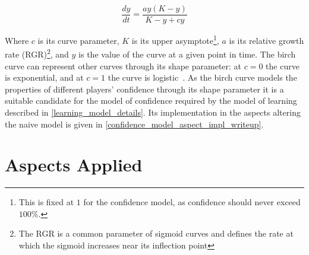\[\frac{dy}{dt} = \frac{ay(K-y)}{K-y+cy}\]

Where $c$ is its curve parameter, $K$ is its upper asymptote\footnote{This is
fixed at $1$ for the confidence model, as confidence should never exceed
$100\%$.}, $a$ is its relative growth rate (RGR)\footnote{The RGR is a common
parameter of sigmoid curves and defines the rate at which the sigmoid increases
near its inflection point}, and $y$ is the value of the curve at a given point
in time. The birch curve can represent other curves through its shape parameter:
at $c=0$ the curve is exponential, and at $c=1$ the curve is
logistic~\cite{birch1999new}. As the birch curve models the properties of
different players' confidence through its shape parameter it is a suitable
candidate for the model of confidence required by the model of learning
described in \cref{learning_model_details}. Its implementation in the aspects
altering the naive model is given in
\cref{confidence_model_aspect_impl_writeup}.


\section{Aspects Applied}
\label{sec:optimisation_with_aspects_aspectsdeveloped}
\label{aspects_applied_section}







